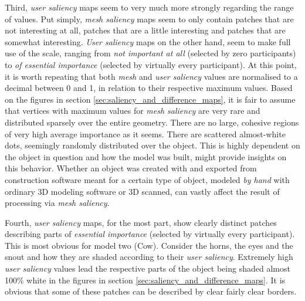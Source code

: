 Third, \textit{user saliency} maps seem to very much more strongly regarding the range of values. Put simply, \textit{mesh saliency} maps seem to only contain patches that are not interesting at all, patches that are a little interesting and patches that are somewhat interesting. \textit{User saliency} maps on the other hand, seem to make full use of the scale, ranging from \textit{not important at all} (selected by zero participants) to \textit{of essential importance} (selected by virtually every participant). At this point, it is worth repeating that both \textit{mesh} and \textit{user saliency} values are normalised to a decimal between 0 and 1, in relation to their respective maximum values. Based on the figures in section \ref{sec:saliency_and_difference_maps}, it is fair to assume that vertices with maximum values for \textit{mesh saliency} are very rare and distributed sparsely over the entire geometry. There are no large, cohesive regions of very high average importance as it seems. There are scattered almost-white dots, seemingly randomly distributed over the object. This is highly dependent on the object in question and how the model was built, might provide insights on this behavior. Whether an object was created with and exported from construction software meant for a certain type of object, modeled \textit{by hand} with ordinary 3D modeling software or 3D scanned, can vastly affect the result of processing via \textit{mesh saliency}.

Fourth, \textit{user saliency} maps, for the most part, show clearly distinct patches describing parts of \textit{essential importance} (selected by virtually every participant). This is most obvious for model two (Cow). Consider the horns, the eyes and the snout and how they are shaded according to their \textit{user saliency}. Extremely high \textit{user saliency} values lead the respective parts of the object being shaded almost 100\% white in the figures in section \ref{sec:saliency_and_difference_maps}. It is obvious that some of these patches can be described by clear fairly clear borders. 

